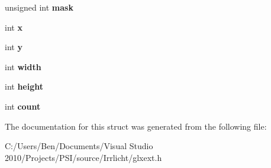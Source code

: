 \begin{DoxyCompactItemize}
\item 
\hypertarget{struct_g_l_x_buffer_clobber_event_s_g_i_x_a74b4ad1ad3cac011001151411f621da1}{unsigned int {\bfseries mask}}\label{struct_g_l_x_buffer_clobber_event_s_g_i_x_a74b4ad1ad3cac011001151411f621da1}

\item 
\hypertarget{struct_g_l_x_buffer_clobber_event_s_g_i_x_a5118d48c3c8d5253d39922b5014b52ff}{int {\bfseries x}}\label{struct_g_l_x_buffer_clobber_event_s_g_i_x_a5118d48c3c8d5253d39922b5014b52ff}

\item 
\hypertarget{struct_g_l_x_buffer_clobber_event_s_g_i_x_aef21efa11558a5b67861f96471c56003}{int {\bfseries y}}\label{struct_g_l_x_buffer_clobber_event_s_g_i_x_aef21efa11558a5b67861f96471c56003}

\item 
\hypertarget{struct_g_l_x_buffer_clobber_event_s_g_i_x_adad23535733161528427584a42bfc6eb}{int {\bfseries width}}\label{struct_g_l_x_buffer_clobber_event_s_g_i_x_adad23535733161528427584a42bfc6eb}

\item 
\hypertarget{struct_g_l_x_buffer_clobber_event_s_g_i_x_a7838dbabb76c22aa8241310a3f2363ea}{int {\bfseries height}}\label{struct_g_l_x_buffer_clobber_event_s_g_i_x_a7838dbabb76c22aa8241310a3f2363ea}

\item 
\hypertarget{struct_g_l_x_buffer_clobber_event_s_g_i_x_ad8f4f0aae058e0a1ff542679823e37a9}{int {\bfseries count}}\label{struct_g_l_x_buffer_clobber_event_s_g_i_x_ad8f4f0aae058e0a1ff542679823e37a9}

\end{DoxyCompactItemize}


The documentation for this struct was generated from the following file\-:\begin{DoxyCompactItemize}
\item 
C\-:/\-Users/\-Ben/\-Documents/\-Visual Studio 2010/\-Projects/\-P\-S\-I/source/\-Irrlicht/glxext.\-h\end{DoxyCompactItemize}
